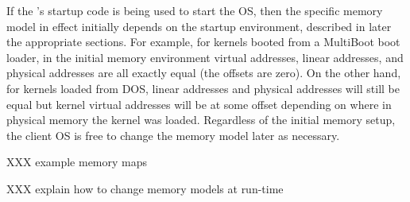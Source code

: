 If the \oskit{}'s startup code is being used to start the OS,
then the specific memory model in effect initially
depends on the startup environment,
described in later the appropriate sections.
For example, for kernels booted from a MultiBoot boot loader,
in the initial memory environment
virtual addresses, linear addresses, and physical addresses
are all exactly equal (the offsets are zero).
On the other hand, for kernels loaded from DOS,
linear addresses and physical addresses will still be equal
but kernel virtual addresses will be at some offset
depending on where in physical memory the kernel was loaded.
Regardless of the initial memory setup,
the client OS is free to change the memory model later as necessary.

XXX example memory maps

XXX explain how to change memory models at run-time

